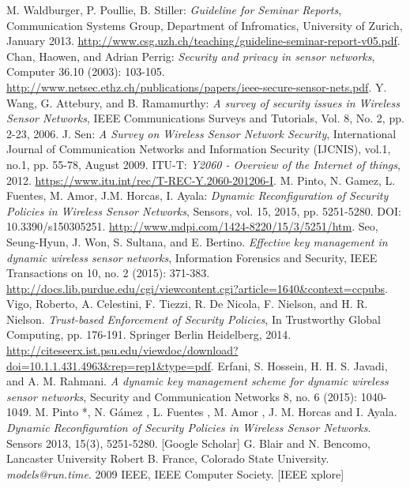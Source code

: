 \documentclass[12pt,a4paper,twoside]{report}
\begin{document}
\begin{thebibliography}{99}
 M. Waldburger, P. Poullie, B. Stiller: \emph{Guideline for Seminar Reports}, Communication Systems Group, Department of Infromatics, University of Zurich, January 2013. \url{http://www.csg.uzh.ch/teaching/guideline-seminar-report-v05.pdf}.
 Chan, Haowen, and Adrian Perrig: \emph{Security and privacy in sensor networks}, Computer 36.10 (2003): 103-105. \url{http://www.netsec.ethz.ch/publications/papers/ieee-secure-sensor-nets.pdf}.
 Y. Wang, G. Attebury, and B. Ramamurthy: \emph{A survey of security issues in Wireless Sensor Networks}, IEEE Communications Surveys and Tutorials, Vol. 8, No. 2, pp. 2-23, 2006.
 J. Sen: \emph{A Survey on Wireless Sensor Network Security}, International Journal of Communication Networks and Information Security (IJCNIS), vol.1, no.1, pp. 55-78, August 2009.
 ITU-T: \emph{Y2060 - Overview of the Internet of things}, 2012. \url{https://www.itu.int/rec/T-REC-Y.2060-201206-I}.
 M. Pinto, N. Gamez, L. Fuentes, M. Amor, J.M. Horcas, I. Ayala: \emph{Dynamic Reconfiguration of Security Policies in Wireless Sensor Networks}, Sensors, vol. 15, 2015, pp. 5251-5280. DOI: 10.3390/s150305251. \url{http://www.mdpi.com/1424-8220/15/3/5251/htm}.
 Seo, Seung-Hyun, J. Won, S. Sultana, and E. Bertino. \emph{Effective key management in dynamic wireless sensor networks}, Information Forensics and Security, IEEE Transactions on 10, no. 2 (2015): 371-383. \url{http://docs.lib.purdue.edu/cgi/viewcontent.cgi?article=1640&context=ccpubs}.
 Vigo, Roberto, A. Celestini, F. Tiezzi, R. De Nicola, F. Nielson, and H. R. Nielson. \emph{Trust-based Enforcement of Security Policies}, In Trustworthy Global Computing, pp. 176-191. Springer Berlin Heidelberg, 2014. \url{http://citeseerx.ist.psu.edu/viewdoc/download?doi=10.1.1.431.4963&rep=rep1&type=pdf}.
 Erfani, S. Hossein, H. H. S. Javadi, and A. M. Rahmani. \emph{A dynamic key management scheme for dynamic wireless sensor networks}, Security and Communication Networks 8, no. 6 (2015): 1040-1049.
 M. Pinto *, N. G\'{a}mez , L. Fuentes , M. Amor , J. M. Horcas and I. Ayala. \emph{Dynamic Reconfiguration of Security Policies in Wireless Sensor Networks}. Sensors 2013, 15(3), 5251-5280. [Google Scholar]
 G. Blair and N. Bencomo, Lancaster University Robert B. France, Colorado State University. \emph{models@run.time}. 2009 IEEE, IEEE Computer Society. [IEEE xplore]

\end{thebibliography}
\end{document}
